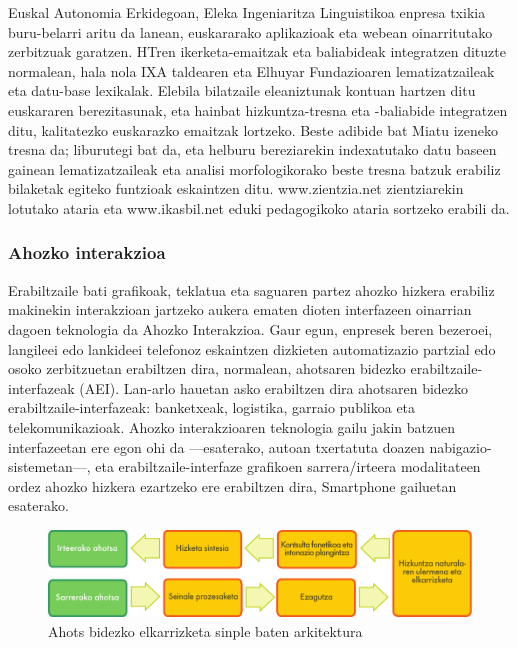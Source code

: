 \begin{multicols}{2}

Euskal Autonomia Erkidegoan, Eleka Ingeniaritza Linguistikoa enpresa txikia buru-belarri aritu da lanean, euskararako aplikazioak eta webean oinarritutako zerbitzuak garatzen. HTren ikerketa-emaitzak eta baliabideak integratzen dituzte normalean, hala nola IXA taldearen eta Elhuyar Fundazioaren lematizatzaileak eta datu-base lexikalak. Elebila bilatzaile eleaniztunak kontuan hartzen ditu euskararen berezitasunak, eta hainbat hizkuntza-tresna eta -baliabide integratzen ditu, kalitatezko euskarazko emaitzak lortzeko. Beste adibide bat Miatu izeneko tresna da; liburutegi bat da, eta helburu bereziarekin indexatutako datu baseen gainean lematizatzaileak eta analisi morfologikorako beste tresna batzuk erabiliz bilaketak egiteko funtzioak eskaintzen ditu. www.zientzia.net zientziarekin lotutako ataria eta www.ikasbil.net eduki pedagogikoko ataria sortzeko erabili da.
  
\subsubsection{Ahozko interakzioa}
  Erabiltzaile bati grafikoak, teklatua eta saguaren partez ahozko hizkera erabiliz makinekin interakzioan jartzeko aukera ematen dioten interfazeen oinarrian dagoen teknologia da Ahozko Interakzioa. Gaur egun, enpresek beren bezeroei, langileei edo lankideei telefonoz eskaintzen dizkieten automatizazio partzial edo osoko zerbitzuetan erabiltzen dira, normalean, ahotsaren bidezko erabiltzaile-interfazeak (AEI). Lan-arlo hauetan asko erabiltzen dira ahotsaren bidezko erabiltzaile-interfazeak: banketxeak, logistika, garraio publikoa eta telekomunikazioak. Ahozko interakzioaren teknologia gailu jakin batzuen interfazeetan ere egon ohi da —esaterako, autoan txertatuta doazen nabigazio-sistemetan—, eta erabiltzaile-interfaze grafikoen sarrera/irteera modalitateen ordez ahozko hizkera ezartzeko ere erabiltzen dira, Smartphone gailuetan esaterako.


\begin{figure}[htb]
  \center  \includegraphics[width=\textwidth]{../_media/basque/simple_speech-based_dialogue_architecture}
  \center
  \caption{Ahots bidezko elkarrizketa sinple baten arkitektura}
  \label{fig:dialoguearch_eu}
\end{figure}


\end{multicols}
